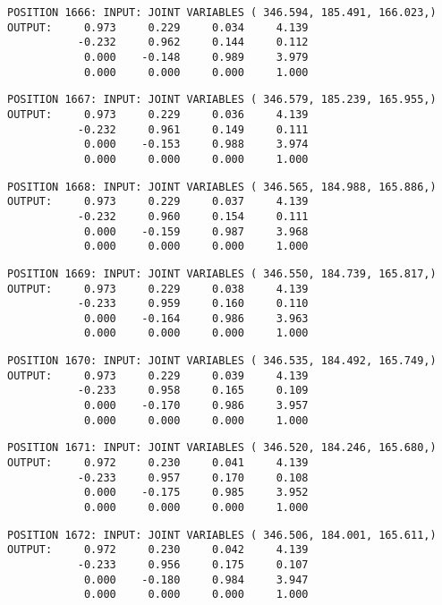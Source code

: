 \begin{verbatim}
POSITION 1666: INPUT: JOINT VARIABLES ( 346.594, 185.491, 166.023,)
OUTPUT:     0.973     0.229     0.034     4.139
           -0.232     0.962     0.144     0.112
            0.000    -0.148     0.989     3.979
            0.000     0.000     0.000     1.000
\end{verbatim} \pagebreak[1]\begin{verbatim}
POSITION 1667: INPUT: JOINT VARIABLES ( 346.579, 185.239, 165.955,)
OUTPUT:     0.973     0.229     0.036     4.139
           -0.232     0.961     0.149     0.111
            0.000    -0.153     0.988     3.974
            0.000     0.000     0.000     1.000
\end{verbatim} \pagebreak[1]\begin{verbatim}
POSITION 1668: INPUT: JOINT VARIABLES ( 346.565, 184.988, 165.886,)
OUTPUT:     0.973     0.229     0.037     4.139
           -0.232     0.960     0.154     0.111
            0.000    -0.159     0.987     3.968
            0.000     0.000     0.000     1.000
\end{verbatim} \pagebreak[1]\begin{verbatim}
POSITION 1669: INPUT: JOINT VARIABLES ( 346.550, 184.739, 165.817,)
OUTPUT:     0.973     0.229     0.038     4.139
           -0.233     0.959     0.160     0.110
            0.000    -0.164     0.986     3.963
            0.000     0.000     0.000     1.000
\end{verbatim} \pagebreak[1]\begin{verbatim}
POSITION 1670: INPUT: JOINT VARIABLES ( 346.535, 184.492, 165.749,)
OUTPUT:     0.973     0.229     0.039     4.139
           -0.233     0.958     0.165     0.109
            0.000    -0.170     0.986     3.957
            0.000     0.000     0.000     1.000
\end{verbatim} \pagebreak[1]\begin{verbatim}
POSITION 1671: INPUT: JOINT VARIABLES ( 346.520, 184.246, 165.680,)
OUTPUT:     0.972     0.230     0.041     4.139
           -0.233     0.957     0.170     0.108
            0.000    -0.175     0.985     3.952
            0.000     0.000     0.000     1.000
\end{verbatim} \pagebreak[1]\begin{verbatim}
POSITION 1672: INPUT: JOINT VARIABLES ( 346.506, 184.001, 165.611,)
OUTPUT:     0.972     0.230     0.042     4.139
           -0.233     0.956     0.175     0.107
            0.000    -0.180     0.984     3.947
            0.000     0.000     0.000     1.000
\end{verbatim} \pagebreak[1]\begin{verbatim}

\end{verbatim}
